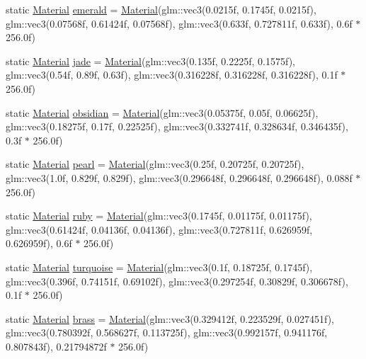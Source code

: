 \begin{DoxyCompactItemize}
\item 
static \mbox{\hyperlink{struct_material}{Material}} \mbox{\hyperlink{struct_material_ad6a424d01ca060a25ce520c4dc5b00c2}{emerald}} = \mbox{\hyperlink{struct_material}{Material}}(glm\+::vec3(0.\+0215f, 0.\+1745f, 0.\+0215f), glm\+::vec3(0.\+07568f, 0.\+61424f, 0.\+07568f), glm\+::vec3(0.\+633f, 0.\+727811f, 0.\+633f), 0.\+6f $\ast$ 256.\+0f)
\item 
static \mbox{\hyperlink{struct_material}{Material}} \mbox{\hyperlink{struct_material_ab321b1fd760849c28860768bc08c3719}{jade}} = \mbox{\hyperlink{struct_material}{Material}}(glm\+::vec3(0.\+135f, 0.\+2225f, 0.\+1575f), glm\+::vec3(0.\+54f, 0.\+89f, 0.\+63f), glm\+::vec3(0.\+316228f, 0.\+316228f, 0.\+316228f), 0.\+1f $\ast$ 256.\+0f)
\item 
static \mbox{\hyperlink{struct_material}{Material}} \mbox{\hyperlink{struct_material_aa189bbbd916aaf6a451296e2ffc6a47c}{obsidian}} = \mbox{\hyperlink{struct_material}{Material}}(glm\+::vec3(0.\+05375f, 0.\+05f, 0.\+06625f), glm\+::vec3(0.\+18275f, 0.\+17f, 0.\+22525f), glm\+::vec3(0.\+332741f, 0.\+328634f, 0.\+346435f), 0.\+3f $\ast$ 256.\+0f)
\item 
static \mbox{\hyperlink{struct_material}{Material}} \mbox{\hyperlink{struct_material_af1eb6afe67d69a7992ac7bfd31c76173}{pearl}} = \mbox{\hyperlink{struct_material}{Material}}(glm\+::vec3(0.\+25f, 0.\+20725f, 0.\+20725f), glm\+::vec3(1.\+0f, 0.\+829f, 0.\+829f), glm\+::vec3(0.\+296648f, 0.\+296648f, 0.\+296648f), 0.\+088f $\ast$ 256.\+0f)
\item 
static \mbox{\hyperlink{struct_material}{Material}} \mbox{\hyperlink{struct_material_ae269e4b2375a840f121a2560a9d2b05b}{ruby}} = \mbox{\hyperlink{struct_material}{Material}}(glm\+::vec3(0.\+1745f, 0.\+01175f, 0.\+01175f), glm\+::vec3(0.\+61424f, 0.\+04136f, 0.\+04136f), glm\+::vec3(0.\+727811f, 0.\+626959f, 0.\+626959f), 0.\+6f $\ast$ 256.\+0f)
\item 
static \mbox{\hyperlink{struct_material}{Material}} \mbox{\hyperlink{struct_material_aa0d30b652e32ae61aa50cedf8ed38656}{turquoise}} = \mbox{\hyperlink{struct_material}{Material}}(glm\+::vec3(0.\+1f, 0.\+18725f, 0.\+1745f), glm\+::vec3(0.\+396f, 0.\+74151f, 0.\+69102f), glm\+::vec3(0.\+297254f, 0.\+30829f, 0.\+306678f), 0.\+1f $\ast$ 256.\+0f)
\item 
static \mbox{\hyperlink{struct_material}{Material}} \mbox{\hyperlink{struct_material_a9db90c13365c8487d52c24bb2ab1882b}{brass}} = \mbox{\hyperlink{struct_material}{Material}}(glm\+::vec3(0.\+329412f, 0.\+223529f, 0.\+027451f), glm\+::vec3(0.\+780392f, 0.\+568627f, 0.\+113725f), glm\+::vec3(0.\+992157f, 0.\+941176f, 0.\+807843f), 0.\+21794872f $\ast$ 256.\+0f)

\end{DoxyCompactItemize}
